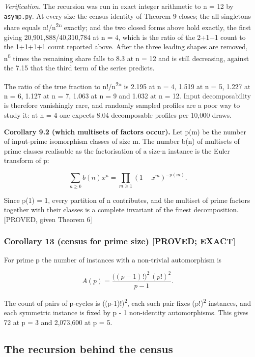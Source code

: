 \documentclass[
  11pt,
]{article}
\begin{document}
\emph{Verification.} The recursion was run in exact integer arithmetic
to n = 12 by \texttt{asymp.py}. At every size the census identity of
Theorem 9 closes; the all-singletons share equals
n!/n\textsuperscript{2n} exactly; and the two closed forms above hold
exactly, the first giving 20,901,888/40,310,784 at n = 4, which is the
ratio of the 2+1+1 count to the 1+1+1+1 count reported above. After the
three leading shapes are removed, n\textsuperscript{6} times the
remaining share falls to 8.3 at n = 12 and is still decreasing, against
the 7.15 that the third term of the series predicts.

The ratio of the true fraction to n!/n\textsuperscript{2n} is 2.195 at n
= 4, 1.519 at n = 5, 1.227 at n = 6, 1.127 at n = 7, 1.063 at n = 9 and
1.032 at n = 12. Input decomposability is therefore vanishingly rare,
and randomly sampled profiles are a poor way to study it: at n = 4 one
expects 8.04 decomposable profiles per 10,000 draws.

\textbf{Corollary 9.2 (which multisets of factors occur).} Let p(m) be
the number of input-prime isomorphism classes of size m. The number b(n)
of multisets of prime classes realisable as the factorisation of a
size-n instance is the Euler transform of p:

\[
\sum_{n\ge 0}b(n)x^{n}=\prod_{m\ge 1}(1-x^{m})^{-p(m)} .
\]

Since p(1) = 1, every partition of n contributes, and the multiset of
prime factors together with their classes is a complete invariant of the
finest decomposition. {[}PROVED, given Theorem 6{]}

\hypertarget{corollary-13-census-for-prime-size-proved-exact}{%
\subsubsection{Corollary 13 (census for prime size) {[}PROVED;
EXACT{]}}\label{corollary-13-census-for-prime-size-proved-exact}}

For prime p the number of instances with a non-trivial automorphism is

\[
A(p)=\frac{\big((p-1)!\big)^{2}\,(p!)^{2}}{p-1}.
\]

The count of pairs of p-cycles is ((p-1)!)\textsuperscript{2}, each such
pair fixes (p!)\textsuperscript{2} instances, and each symmetric
instance is fixed by p - 1 non-identity automorphisms. This gives 72 at
p = 3 and 2,073,600 at p = 5.

\hypertarget{the-recursion-behind-the-census}{%
\subsection{The recursion behind the
census}\label{the-recursion-behind-the-census}}
\end{document}
